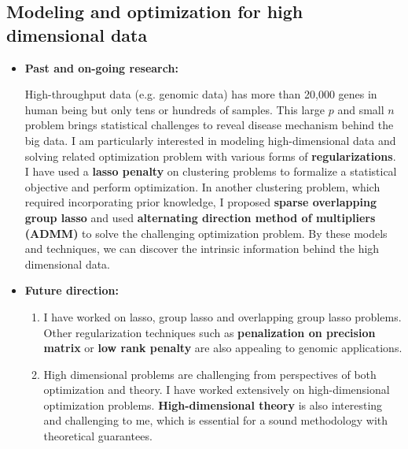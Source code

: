 \documentclass[a4paper, 10pt]{article}
\begin{document}
\subsection{Modeling and optimization for high dimensional data}
\begin{itemize}
\item \textbf{Past and on-going research:}

High-throughput data (e.g. genomic data) has more than 20,000 genes in human being but only tens or hundreds of samples.
This large $p$ and small $n$ problem brings statistical challenges to reveal disease mechanism behind the big data.
I am particularly interested in modeling high-dimensional data and solving related optimization problem with various forms of \textbf{regularizations}.
I have used a \textbf{lasso penalty} on clustering problems to formalize a statistical objective and perform optimization\cite{ref:MSKM}.
In another clustering problem, which required incorporating prior knowledge, 
I proposed \textbf{sparse overlapping group lasso} and used \textbf{alternating direction method of multipliers (ADMM)} to solve the challenging optimization problem\cite{ref:ISKmeans}.
By these models and techniques, we can discover the intrinsic information behind the high dimensional data.

\item \textbf{Future direction:}
\begin{enumerate}
\item I have worked on lasso, group lasso and overlapping group lasso problems.
Other regularization techniques such as \textbf{penalization on precision matrix} or \textbf{low rank penalty} are also appealing to genomic applications.
\item High dimensional problems are challenging from perspectives of both optimization and theory.
I have worked extensively on high-dimensional optimization problems.
\textbf{High-dimensional theory} is also interesting and challenging to me, which is essential for a  sound methodology with theoretical guarantees. 
\end{enumerate}

\end{itemize}
\end{document}
